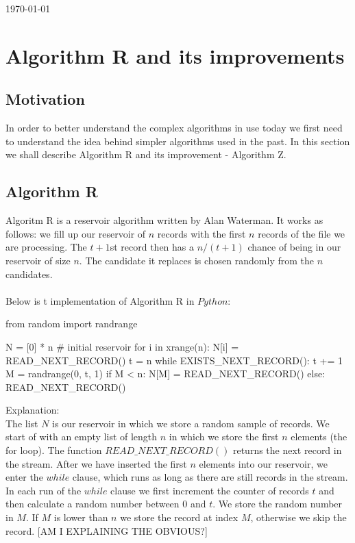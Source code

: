 \documentclass[journal]{IEEEtran/IEEEtran}
\begin{document}
 
\hfill \today
\section{Algorithm R and its improvements}
\subsection{Motivation}
In order to better understand the complex algorithms in use today we first need to understand the idea behind simpler algorithms used in the past. In this section we shall describe Algorithm R and its improvement - Algorithm Z.

\subsection{Algorithm R}
Algoritm R is a reservoir algorithm written by Alan Waterman. It works as follows: we fill up our reservoir of $n$ records with the first $n$ records of the file we are processing. The $t + 1$st record then has a $n/(t + 1)$ chance of being in our reservoir of size $n$. The candidate it replaces is chosen randomly from the $n$ candidates.
\\\\
Below is t implementation of Algorithm R in $Python$:\\
\begin{code}
from random import randrange

N = [0] * n # initial reservoir
for i in xrange(n):
	N[i] = READ_NEXT_RECORD()
t = n
while EXISTS_NEXT_RECORD():
	t += 1
	M = randrange(0, t, 1)
	if M < n:
		N[M] = READ_NEXT_RECORD()
	else:
		READ_NEXT_RECORD()	
\end{code}
Explanation:\\
The list $N$ is our reservoir in which we store a random sample of records. We start of with an empty list of length $n$ in which we store the first $n$ elements (the for loop). The function $READ\_NEXT\_RECORD()$ returns the next record in the stream. After we have inserted the first $n$ elements into our reservoir, we enter the $while$ clause, which runs as long as there are still records in the stream. In each run of the $while$ clause we first increment the counter of records $t$ and then calculate a random number between $0$ and $t$. We store the random number in $M$. If $M$ is lower than $n$ we store the record at index $M$, otherwise we skip the record. [AM I EXPLAINING THE OBVIOUS?]
\end{document}
